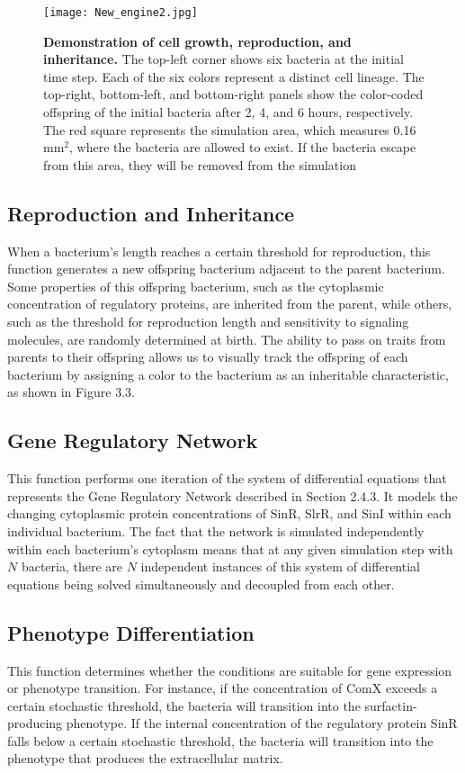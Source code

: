 \begin{figure}[h]
    \centering
    \texttt{[image: New\_engine2.jpg]}
    \caption{\footnotesize \textbf{Demonstration of cell growth, reproduction, and inheritance.} The top-left corner shows six bacteria at the initial time step. Each of the six colors represent a distinct cell lineage. The top-right, bottom-left, and bottom-right panels show the color-coded offspring of the initial bacteria after 2, 4, and 6 hours, respectively. The red square represents the simulation area, which measures 0.16 mm\(^2\), where the bacteria are allowed to exist. If the bacteria escape from this area, they will be removed from the simulation}
\end{figure}
\subsection{Reproduction and Inheritance} When a bacterium's length reaches a certain threshold for reproduction, this function generates a new offspring bacterium adjacent to the parent bacterium. Some properties of this offspring bacterium, such as the cytoplasmic concentration of regulatory proteins, are inherited from the parent, while others, such as the threshold for reproduction length and sensitivity to signaling molecules, are randomly determined at birth. The ability to pass on traits from parents to their offspring allows us to visually track the offspring of each bacterium by assigning a color to the bacterium as an inheritable characteristic, as shown in Figure 3.3.


\subsection{Gene Regulatory Network} This function performs one iteration of the system of differential equations that represents the Gene Regulatory Network described in Section 2.4.3. It models the changing cytoplasmic protein concentrations of SinR, SlrR, and SinI within each individual bacterium. The fact that the network is simulated independently within each bacterium's cytoplasm means that at any given simulation step with $N$ bacteria, there are $N$ independent instances of this system of differential equations being solved simultaneously and decoupled from each other.

\subsection{Phenotype Differentiation} This function determines whether the conditions are suitable for gene expression or phenotype transition. For instance, if the concentration of ComX exceeds a certain stochastic threshold, the bacteria will transition into the surfactin-producing phenotype. If the internal concentration of the regulatory protein SinR falls below a certain stochastic threshold, the bacteria will transition into the phenotype that produces the extracellular matrix.

